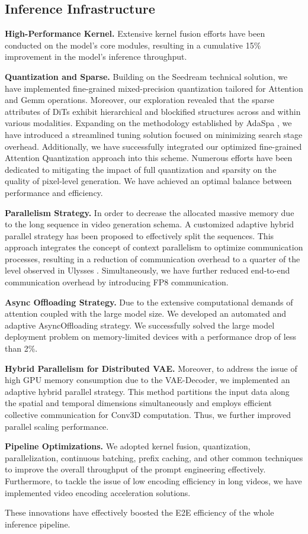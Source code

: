 \subsection{Inference Infrastructure}

\textbf{High-Performance Kernel.} Extensive kernel fusion efforts have been conducted on the model's core modules, resulting in a cumulative 15\% improvement in the model's inference throughput.

\textbf{Quantization and Sparse.} Building on the Seedream \cite{gong2025seedream} technical solution, we have implemented fine-grained mixed-precision quantization tailored for Attention and Gemm operations. Moreover, our exploration revealed that the sparse attributes of DiTs exhibit hierarchical and blockified structures across and within various modalities. Expanding on the methodology established by AdaSpa \cite{adaspa}, we have introduced a streamlined tuning solution focused on minimizing search stage overhead. Additionally, we have successfully integrated our optimized fine-grained Attention Quantization approach into this scheme. Numerous efforts have been dedicated to mitigating the impact of full quantization and sparsity on the quality of pixel-level generation. We have achieved an optimal balance between performance and efficiency.

\textbf{Parallelism Strategy.} In order to decrease the allocated massive memory due to the long sequence in video generation schema. A customized adaptive hybrid parallel strategy has been proposed to effectively split the sequences. This approach integrates the concept of context parallelism to optimize communication processes, resulting in a reduction of communication overhead to a quarter of the level observed in Ulysses \cite{jacobs2023deepspeed}. Simultaneously, we have further reduced end-to-end communication overhead by introducing FP8 communication. 

\textbf{Async Offloading Strategy.} Due to the extensive computational demands of attention coupled with the large model size. We developed an automated and adaptive AsyncOffloading strategy. We successfully solved the large model deployment problem on memory-limited devices with a performance drop of less than 2\%.

\textbf{Hybrid Parallelism for Distributed VAE.} Moreover, to address the issue of high GPU memory consumption due to the VAE-Decoder, we implemented an adaptive hybrid parallel strategy. This method partitions the input data along the spatial and temporal dimensions simultaneously and employs efficient collective communication for Conv3D computation. Thus, we further improved parallel scaling performance.

\textbf{Pipeline Optimizations.} We adopted kernel fusion, quantization, parallelization, continuous batching, prefix caching, and other common techniques to improve the overall throughput of the prompt engineering effectively. Furthermore, to tackle the issue of low encoding efficiency in long videos, we have implemented video encoding acceleration solutions. 

These innovations have effectively boosted the E2E efficiency of the whole inference pipeline.